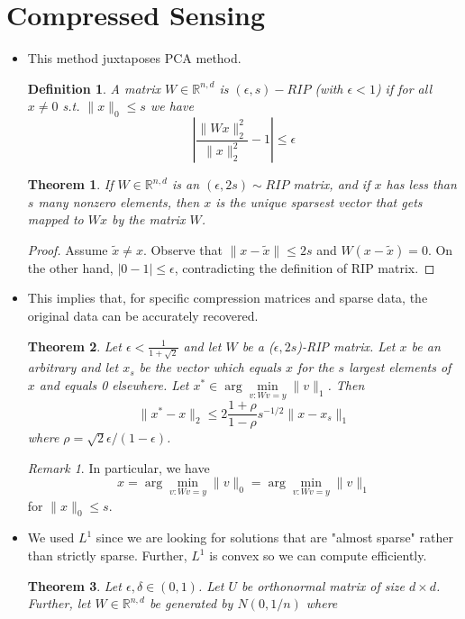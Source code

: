 \documentclass[11pt,reqno]{amsart}
\newtheorem{theorem}{Theorem}
\newtheorem{definition}{Definition}
\theoremstyle{remark}
\newtheorem{remark}[example]{Remark}
\begin{document}
\begin{sloppypar}
\section{Compressed Sensing}
\begin{itemize}
\item This method juxtaposes PCA method.
\begin{definition}
A matrix $W\in \mathbb{R}^{n,d}$ is $(\epsilon, s)-RIP$ (with $\epsilon<1$) if for all $x\neq 0$ s.t. $\lVert x\rVert_0\leq s$
 we have 
 \[
|\frac{\lVert Wx\rVert^2_2}{\lVert x\rVert^2_2}-1|\leq \epsilon
 \]
\end{definition}
\begin{theorem}
If $W\in\mathbb{R}^{n,d}$ is an $(\epsilon, 2s)\sim RIP$ matrix, 
and if $x$ has less than $s$ many nonzero elements, then $x$ is the unique sparsest vector that
 gets mapped to $Wx$ by the matrix $W$.
\end{theorem}
\begin{proof}
Assume $\tilde x\neq x$. Observe that 
$\lVert x-\tilde x\rVert\leq 2s$ and $W(x-\tilde x)=0$. 
On the other hand, $\lvert 0-1\rvert\leq \epsilon$, contradicting 
the definition of RIP matrix.
\end{proof}
\item This implies that, for specific compression matrices and sparse data, the original data 
can be accurately recovered.
\begin{theorem}
Let $\epsilon<\frac 1{1+\sqrt{2}}$ and let $W$ be a ($\epsilon, 2s$)-RIP matrix. Let
 $x$ be an arbitrary and let $x_s$ be the vector which equals $x$ for the $s$ largest
  elements of $x$ and equals 0 elsewhere. Let $x^*\in \arg\min\limits_{v:Wv=y}\lVert
    v\rVert_1$. Then
\[
\lVert x^*-x\rVert_2\leq 2\frac{1+\rho}{1-\rho}s^{-1/2}\lVert x-x_s\rVert_1
\]
where $\rho=\sqrt{2}\epsilon/(1-\epsilon)$.
\end{theorem}
\begin{remark}
In particular, we have 
\[
x=\arg\min\limits_{v:Wv=y}\lVert
v\rVert_0=\arg\min\limits_{v:Wv=y}\lVert v\rVert_1
\]
for $\lVert x\rVert_0\leq s$.
\end{remark}
\item We used $L^1$ since we are looking for
solutions that are "almost sparse" rather than strictly sparse. Further, 
$L^1$ is convex so we can compute efficiently.
\begin{theorem}
Let $\epsilon, \delta\in(0,1)$.
Let $U$ be orthonormal matrix of size $d\times d$. Further, 
let $W\in\mathbb{R}^{n,d}$ be generated by $N(0,1/n)$ where 

\end{theorem}
\end{itemize}
\end{sloppypar}
\end{document}

